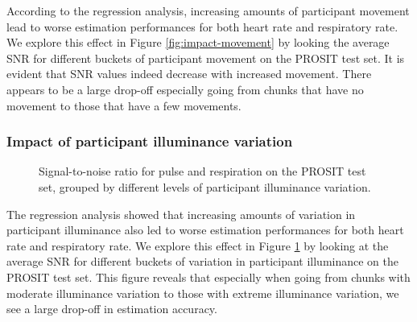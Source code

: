 \documentclass{article}
\begin{document}
According to the regression analysis, increasing amounts of participant movement lead to worse estimation performances for both heart rate and respiratory rate.
We explore this effect in Figure \ref{fig:impact-movement} by looking the average SNR for different buckets of participant movement on the PROSIT test set.
It is evident that SNR values indeed decrease with increased movement.
There appears to be a large drop-off especially going from chunks that have no movement to those that have a few movements.

\subsubsection{Impact of participant illuminance variation}

\datatable

\begin{figure}[h!]
  \centering
  \caption{Signal-to-noise ratio for pulse and respiration on the PROSIT test set, grouped by different levels of participant illuminance variation.}
  \label{fig:impact-illuminance}
\end{figure}

The regression analysis showed that increasing amounts of variation in participant illuminance also led to worse estimation performances for both heart rate and respiratory rate.
We explore this effect in Figure \ref{fig:impact-illuminance} by looking at the average SNR for different buckets of variation in participant illuminance on the PROSIT test set.
This figure reveals that especially when going from chunks with moderate illuminance variation to those with extreme illuminance variation, we see a large drop-off in estimation accuracy.
\end{document}
